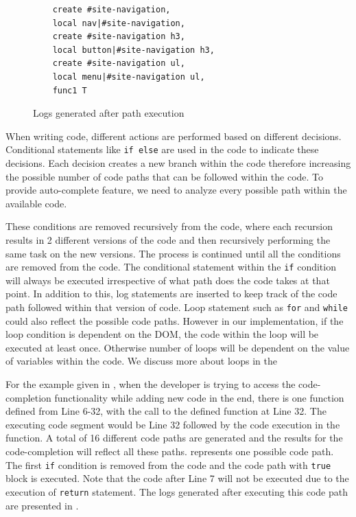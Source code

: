 			
			\begin{figure}
			\medskip
			\begin{lstlisting}
	create #site-navigation, 
	local nav|#site-navigation, 
	create #site-navigation h3, 
	local button|#site-navigation h3, 
	create #site-navigation ul, 
	local menu|#site-navigation ul, 
	func1 T 
			\end{lstlisting}
			\caption{Logs generated after path execution}
			\label{Fig:Logs}
			\end{figure}
			
		
		When writing code, different actions are performed based on different decisions. Conditional statements like \texttt{if else} are used in the code to indicate these decisions. Each decision creates a new branch within the code therefore increasing the possible number of code paths that can be followed within the code. To provide auto-complete feature, we need to analyze every possible path within the available \javascript code.
		
		These conditions are removed recursively from the code, where each recursion results in 2 different versions of the code and then recursively performing the same task on the new versions. The process is continued until all the conditions are removed from the code. The conditional statement within the \texttt{if} condition will always be executed irrespective of what path does the code takes at that point. In addition to this, log statements are inserted to keep track of the code path followed within that version of code. Loop statement such as \texttt{for} and \texttt{while} could also reflect the possible code paths. However in our implementation, if the loop condition is dependent on the DOM, the code within the loop will be executed at least once. Otherwise number of loops will be dependent on the value of variables within the code. We discuss more about loops in the 
		
		For the example given in , when the developer is trying to access the code-completion functionality while adding new code in the end, there is one function defined from Line 6-32, with the call to the defined function at Line 32. The executing code segment would be Line 32 followed by the code execution in the function. A total of 16 different code paths are generated and the results for the code-completion will reflect all these paths.  represents one possible code path. The first \texttt{if} condition is removed from the code and the code path with \texttt{true} block is executed. Note that the code after Line 7 will not be executed due to the execution of \texttt{return} statement. The logs generated after executing this code path are presented in .	
		

